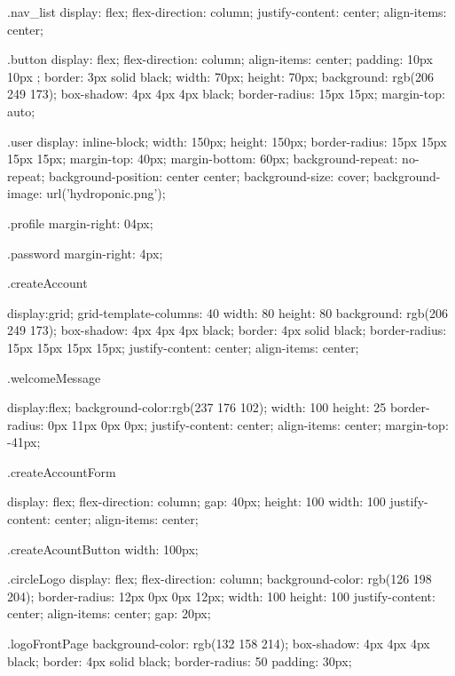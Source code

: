 \documentclass[12pt]{article} %
\begin{document}
\begin{htmlcode}[caption={CSS Stlye Sheet}]

.nav_list
{
    display: flex;
    flex-direction: column;
    justify-content: center;
    align-items: center;
}
    
    
    
.button
{
   display: flex;
   flex-direction: column;
   align-items: center;
   padding: 10px 10px ;
   border: 3px solid black;
   width: 70px; 
   height: 70px; 
   background: rgb(206 249 173);
   box-shadow: 4px 4px 4px black;
   border-radius: 15px 15px;
   margin-top: auto;
}
    
.user 
{
   display: inline-block;
   width: 150px;
   height: 150px;
   border-radius: 15px 15px 15px 15px;
   margin-top: 40px;
   margin-bottom: 60px;
   background-repeat: no-repeat;
   background-position: center center;
   background-size: cover;
   background-image: url('hydroponic.png');
}
    
.profile
{
   margin-right: 04px;
}
    
.password
{
   margin-right: 4px;
}


.createAccount
{
   display:grid;
   grid-template-columns: 40%
   width: 80%
   height: 80%
   background: rgb(206 249 173);
   box-shadow: 4px 4px 4px black;
   border: 4px solid black;
   border-radius: 15px 15px 15px 15px;
   justify-content: center;
   align-items: center;

}

.welcomeMessage
{
   display:flex;
   background-color:rgb(237 176 102); 
   width: 100%
   height: 25%
   border-radius: 0px 11px 0px 0px;
   justify-content: center;
   align-items: center;
   margin-top: -41px;
   
}

.createAccountForm
{
   display: flex;
   flex-direction: column;
   gap: 40px;
   height: 100%
   width: 100%
   justify-content: center;
   align-items: center;

}

.createAcountButton 
{
width: 100px;
}



.circleLogo
{
   display: flex;
   flex-direction: column;
   background-color: rgb(126 198 204);
   border-radius: 12px 0px 0px 12px;
   width: 100%
   height: 100%
   justify-content: center;
   align-items: center;
   gap: 20px;
}
    

.logoFrontPage
{
   background-color: rgb(132 158 214);
   box-shadow: 4px 4px 4px black;
   border: 4px solid black;
   border-radius: 50%
   padding: 30px;
}



\end{htmlcode}
\end{document}
